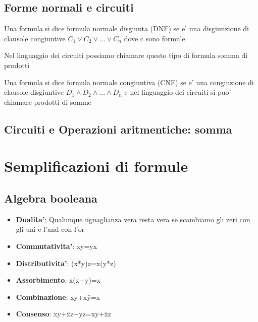 \documentclass{article}
\begin{document}
          \subsection{Forme normali e circuiti}
          \begin{flushleft}
            Una formula si dice formula normale disgiunta (DNF) se e' una disgiunzione di clausole congiuntive
            $C_1 \lor C_2 \lor ... \lor C_n$ dove c sono formule
          \end{flushleft}
          \begin{flushleft}
            Nel linguaggio dei circuiti possiamo chiamare questo tipo di formula somma di prodotti
          \end{flushleft}
          \begin{flushleft}
            Una formula si dice formula normale congiuntiva (CNF) se e' una conginzione di clausole disgiuntive
            $D_1 \land D_2 \land ... \land D_n$ e nel linguaggio dei circuiti si puo' chiamare prodotti di somme
          \end{flushleft}
          \subsection{Circuiti e Operazioni aritmentiche: somma}
          \begin{flushleft}
            
          \end{flushleft}
          \section{Semplificazioni di formule}
          \subsection{Algebra booleana}
          \begin{itemize}
            \item \textbf{Dualita'}: Qualunque uguaglianza vera resta vera se scambiamo gli zeri con gli uni e l'and con l'or
            \item \textbf{Commutativita'}: xy=yx
            \item \textbf{Distributivita'}: (x*y)z=x(y*z)
            \item \textbf{Assorbimento}: x(x+y)=x
            \item \textbf{Combinazione}: xy+x\=y=x
            \item \textbf{Consenso}: xy+\=xz+yz=xy+\=xz
          \end{itemize}
\end{document}
